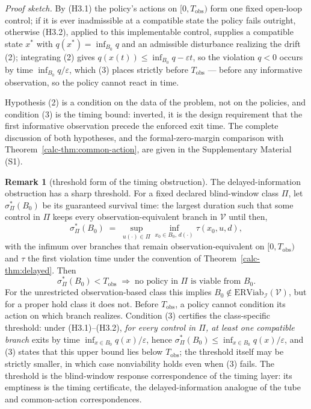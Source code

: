 \documentclass[10pt,twocolumn]{article}
\theoremstyle{definition}
\newtheorem{remark}{Remark}
\begin{document}
\emph{Proof sketch.} By (H3.1) the policy's actions on \([0, T_{\mathrm{obs}})\) form one fixed open-loop control; if it is ever inadmissible at a compatible state the policy fails outright, otherwise (H3.2), applied to this implementable control, supplies a compatible state \(x^*\) with \(q(x^*) = \inf_{B_0} q\) and an admissible disturbance realizing the drift (2); integrating (2) gives \(q(x(t)) \le \inf_{B_0} q - \varepsilon t\), so the violation \(q < 0\) occurs by time \(\inf_{B_0} q / \varepsilon\), which (3) places strictly before \(T_{\mathrm{obs}}\) --- before any informative observation, so the policy cannot react in time.

Hypothesis (2) is a condition on the data of the problem, not on the policies, and condition (3) is the timing bound: inverted, it is the design requirement that the first informative observation precede the enforced exit time. The complete discussion of both hypotheses, and the formal-zero-margin comparison with Theorem~\ref{calc-thm:common-action}, are given in the Supplementary Material (S1).

\begin{remark}[threshold form of the timing obstruction]\label{calc-rem:sigma}
The delayed-information obstruction has a sharp threshold. For a fixed declared blind-window class \(\Pi\), let
\(\sigma^*_{\Pi}(B_0)\) be its guaranteed survival time: the
largest duration such that some control in \(\Pi\) keeps every
observation-equivalent branch in \(\mathcal{V}\) until then,
\[\sigma^*_{\Pi}(B_0) \;=\; \sup_{u(\cdot)\in\Pi} \inf_{x_0\in B_0,\, d(\cdot)} \tau(x_0,u,d),\]
with the infimum over branches that remain observation-equivalent on
\([0,T_{\mathrm{obs}})\) and \(\tau\) the first violation time under the
convention of Theorem~\ref{calc-thm:delayed}. Then
\[\sigma^*_{\Pi}(B_0) < T_{\mathrm{obs}} \;\Longrightarrow\;
\text{no policy in }\Pi\text{ is viable from }B_0.\]
For the unrestricted observation-based class this implies
\(B_0\notin\mathrm{ERViab}_{\mathcal I}(\mathcal V)\), but for a
proper hold class it does not. Before \(T_{\mathrm{obs}}\), a policy
cannot condition its action on which branch realizes. Condition (3)
certifies the class-specific threshold: under (H3.1)--(H3.2),
\emph{for every control in \(\Pi\), at least one compatible branch}
exits by time \(\inf_{x\in B_0}q(x)/\varepsilon\), hence
\(\sigma^*_{\Pi}(B_0)\le\inf_{x\in B_0}q(x)/\varepsilon\), and (3) states that
this upper bound lies below \(T_{\mathrm{obs}}\); the threshold itself
may be strictly smaller, in which case nonviability holds even when (3)
fails. The threshold is the blind-window response correspondence of the
timing layer: its emptiness is the timing certificate, the
delayed-information analogue of the tube and common-action
correspondences.
\end{remark}
\end{document}
